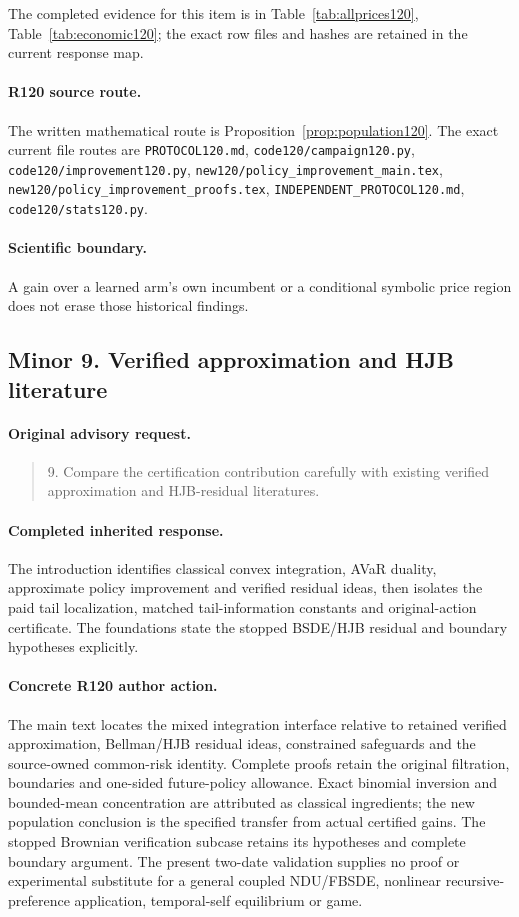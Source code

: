 The completed evidence for this item is in Table~\ref{tab:allprices120}, Table~\ref{tab:economic120}; the exact row files and hashes are retained in the current response map.
\paragraph{R120 source route.}
The written mathematical route is Proposition~\ref{prop:population120}. The exact current file routes are \nolinkurl{PROTOCOL120.md}, \nolinkurl{code120/campaign120.py}, \nolinkurl{code120/improvement120.py}, \nolinkurl{new120/policy_improvement_main.tex}, \nolinkurl{new120/policy_improvement_proofs.tex}, \nolinkurl{INDEPENDENT_PROTOCOL120.md}, \nolinkurl{code120/stats120.py}.
\paragraph{Scientific boundary.}
A gain over a learned arm's own incumbent or a conditional symbolic price region does not erase those historical findings.

\subsection{Minor 9. Verified approximation and HJB literature}
\label{response120:minor-9}
\paragraph{Original advisory request.}
\begin{quote}
9. Compare the certification contribution carefully with existing verified approximation and HJB-residual literatures.
\end{quote}
\paragraph{Completed inherited response.}
The introduction identifies classical convex integration, AVaR duality, approximate policy improvement and verified residual ideas, then isolates the paid tail localization, matched tail-information constants and original-action certificate. The foundations state the stopped BSDE/HJB residual and boundary hypotheses explicitly.
\paragraph{Concrete R120 author action.}
The main text locates the mixed integration interface relative to retained verified approximation, Bellman/HJB residual ideas, constrained safeguards and the source-owned common-risk identity. Complete proofs retain the original filtration, boundaries and one-sided future-policy allowance. Exact binomial inversion and bounded-mean concentration are attributed as classical ingredients; the new population conclusion is the specified transfer from actual certified gains. The stopped Brownian verification subcase retains its hypotheses and complete boundary argument. The present two-date validation supplies no proof or experimental substitute for a general coupled NDU/FBSDE, nonlinear recursive-preference application, temporal-self equilibrium or game.

